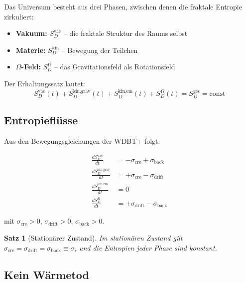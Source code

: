\documentclass[12pt,a4paper]{article}
\newtheorem{satz}{Satz}[section]
\begin{document}
Das Universum besteht aus drei Phasen, zwischen denen die fraktale Entropie zirkuliert:

\begin{itemize}
\item \textbf{Vakuum:} $S_D^{\text{vac}}$ -- die fraktale Struktur des Raums selbst
\item \textbf{Materie:} $S_D^{\text{kin}}$ -- Bewegung der Teilchen
\item \textbf{$\Omega$-Feld:} $S_D^{\Omega}$ -- das Gravitationsfeld als Rotationsfeld
\end{itemize}

Der Erhaltungssatz lautet:
\begin{equation}
S_D^{\text{vac}}(t) + S_D^{\text{kin,grav}}(t) + S_D^{\text{kin,em}}(t) + S_D^{\Omega}(t) = S_D^{\text{ges}} = \text{const}
\end{equation}

\subsection{Entropieflüsse}

Aus den Bewegungsgleichungen der WDBT+ folgt:

\begin{align}
\frac{dS_D^{\text{vac}}}{dt} &= -\sigma_{\text{cre}} + \sigma_{\text{back}} \\
\frac{dS_D^{\text{kin,grav}}}{dt} &= +\sigma_{\text{cre}} - \sigma_{\text{drift}} \\
\frac{dS_D^{\text{kin,em}}}{dt} &= 0 \\
\frac{dS_D^{\Omega}}{dt} &= +\sigma_{\text{drift}} - \sigma_{\text{back}}
\end{align}

mit $\sigma_{\text{cre}} > 0$, $\sigma_{\text{drift}} > 0$, $\sigma_{\text{back}} > 0$.

\begin{satz}[Stationärer Zustand]
Im stationären Zustand gilt $\sigma_{\text{cre}} = \sigma_{\text{drift}} = \sigma_{\text{back}} \equiv \sigma$, und die Entropien jeder Phase sind konstant.
\end{satz}

\subsection{Kein Wärmetod}
\end{document}
